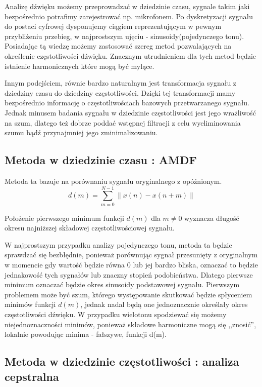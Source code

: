 \documentclass{classrep}
\begin{document}
Analizę dźwięku możemy przeprowadzać w dziedzinie czasu, sygnale takim jaki bezpośrednio potrafimy zarejestrować np. mikrofonem. Po dyskretyzacji sygnału do postaci cyfrowej dysponujemy ciągiem reprezentującym w pewnym przybliżeniu przebieg, w najprostszym ujęciu - sinusoidy(pojedynczego tonu). Posiadając tą wiedzę możemy zastosować szereg metod pozwalających na określenie częstotliwości dźwięku. Znacznym utrudnieniem dla tych metod będzie istnienie harmonicznych które mogą być mylące.

Innym podejściem, równie bardzo naturalnym jest transformacja sygnału z dziedziny czasu do dziedziny częstotliwości. Dzięki tej transformacji mamy bezpośrednio informację o częstotliwościach bazowych przetwarzanego sygnału. Jednak minusem badania sygnału w dziedzinie częstotliwości jest jego wrażliwość na szum, dlatego też dobrze poddać wstępnej filtracji z celu wyeliminowania szumu bądź przynajmniej jego zminimalizowaniu.


\subsection{Metoda w dziedzinie czasu : AMDF}


Metoda ta bazuje na porównaniu sygnału oryginalnego z opóźnionym. 
\begin{equation}
d(m) = \sum \limits ^{N-1} _{m=0} \| x(n) - x(n+m) \|
\end{equation}

Położenie pierwszego minimum funkcji $d(m)$ dla $m \neq 0$ wyznacza długość okresu najniższej składowej częstotliwościowej sygnału.

W najprostszym przypadku analizy pojedynczego tonu, metoda ta będzie sprawdzać się bezbłędnie, ponieważ porównując sygnał przesunięty z oryginalnym w momencie gdy wartość będzie równa 0 lub jej bardzo bliska, oznaczać to będzie jednakowość tych sygnałów lub znaczny stopień podobieństwa. Dlatego pierwsze minimum oznaczać będzie okres sinusoidy podstawowej sygnału. Pierwszym problemem może być szum, którego występowanie skutkować będzie spłyceniem minimów funkcji $d(m)$, jednak nadal będą one jednoznacznie określały okres częstotliwości dźwięku. W przypadku wielotonu spodziewać się możemy niejednoznaczności minimów, ponieważ składowe harmoniczne mogą się ,,znosić'', lokalnie powodując minima - fałszywe, funkcji d(m).

\subsection{Metoda w dziedzinie częstotliwości : analiza cepstralna}
\end{document}
